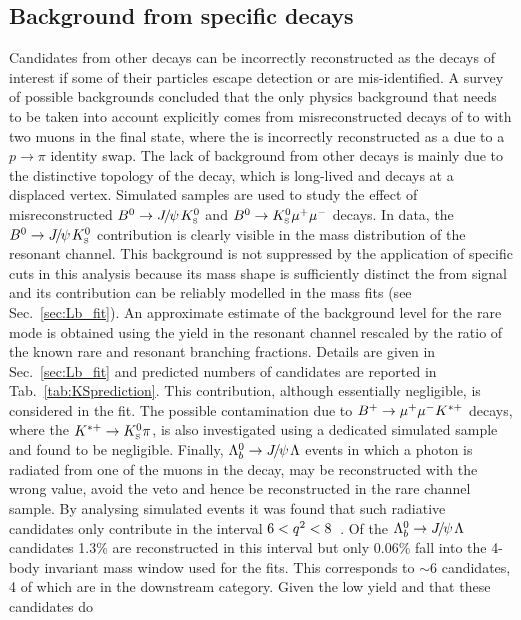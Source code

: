 \subsection{Background from specific decays}

Candidates from other decays can be incorrectly reconstructed as the decays of interest if
some of their particles escape detection or are mis-identified.
A survey of possible backgrounds concluded that the only physics background
that needs to be taken into account explicitly comes from misreconstructed decays of \Bz to \KS with
two muons in the final state, where the \KS is incorrectly reconstructed 
as a \Lz due to a $p\rightarrow \pi$ identity swap.
The lack of background from other decays is
mainly due to the distinctive topology of the \Lz decay, which is long-lived and decays at a displaced vertex.
Simulated samples are used to study the effect of misreconstructed $\Bz\ra\jpsi\KS$ and ${{B}^0}\rightarrow{\ensuremath{{K}^0_{\rm\scriptscriptstyle S}}}{\ensuremath{\mu^+\mu^-}}$ decays. 
In data, the $\Bz\ra\jpsi\KS$ contribution is clearly visible in the mass distribution of the resonant channel.
This background is not suppressed by the application of specific cuts in this analysis because its mass shape is sufficiently 
distinct the from \Lb signal and its contribution can be reliably modelled in the mass fits (see Sec.~\ref{sec:Lb_fit}).
An approximate estimate of the \KS background level for the rare mode is obtained using the yield in the resonant channel
rescaled by the ratio of the known rare and resonant branching fractions.
Details are given in Sec.~\ref{sec:Lb_fit} and predicted numbers of candidates are reported in Tab.~\ref{tab:KSprediction}.
This contribution, although essentially negligible, is considered in the fit.
The possible contamination due to $B^{+} \rightarrow{\ensuremath{\mu^+\mu^-}} K^{*+}$ decays, where the $K^{*+}\to\KS\pi$, is also 
investigated using a dedicated simulated sample and found to be negligible.
Finally, $\Lb\ra\jpsi\Lz$ events 
in which a photon is radiated from one of the muons in the \jpsi decay, may be reconstructed 
with the wrong \qsq value, avoid the \jpsi veto and hence be 
reconstructed in the rare channel sample. By analysing simulated events it was found that 
such radiative candidates only contribute in the \qsq interval $6 < {q^2} < 8$~\gevgevcccc.
Of the $\Lb\to\jpsi\Lz$ candidates 1.3\%  are reconstructed in this \qsq interval but only 0.06\%
fall into the 4-body invariant mass window used for the fits. This corresponds to $\sim 6$
candidates, 4 of which are in the downstream category. Given the low yield and that these candidates do
